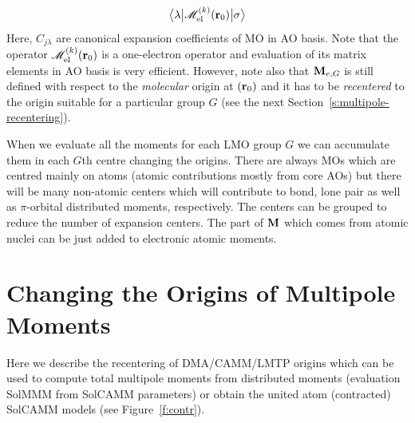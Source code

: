 \documentclass[b5paper,oneside,fleqn,11pt]{book}
\newcommand{\tbraket}[3]{\ensuremath{\bigl\langle {#1} \bigl\lvert {#2} \bigl\lvert {#3} \bigr\rangle}}
\begin{document}
\begin{appendices}
\begin{refsection}
\begin{equation}
   \tbraket{\lambda}{\mathscr{M}^{(k)}_{\rm el}({\bf r}_0)}{\sigma}
\end{equation}
%
Here, $C_{j\lambda}$ are canonical expansion coefficients of MO in AO basis. Note that the
operator $\mathscr{M}^{(k)}_{\rm el}({\bf r}_0)$ is a one\hyp{}electron operator
and evaluation of its matrix elements in AO basis is very efficient. However, 
note also that ${\bf M}_{e,G}$ is still defined with respect to the \emph{molecular} origin at $({\bf r}_0)$
and it has to be \emph{recentered} to the origin suitable for a particular group $G$ (see the
next Section~\ref{s:multipole-recentering}).

When we evaluate all the moments for each LMO group $G$ we can accumulate them in each $G$th centre
changing the origins. There are always MOs which are centred mainly on atoms (atomic contributions
mostly from core AOs) but there will be many non-atomic centers which will contribute to bond, lone pair
as well as $\pi$\hyp{}orbital distributed moments, respectively. The centers can be grouped to reduce the number
of expansion centers. The part of $\bf M$ which comes from atomic
nuclei can be just added to electronic atomic moments.

\section{Changing the Origins of Multipole Moments\label{s:multipole-recentering}}

Here we describe the recentering of DMA/CAMM/LMTP origins which can be used
to compute total multipole moments from distributed moments (evaluation SolMMM from SolCAMM parameters)
or obtain the united atom (contracted) SolCAMM models (see Figure~\ref{f:contr}).


\end{refsection}
\end{appendices}
\end{document}
